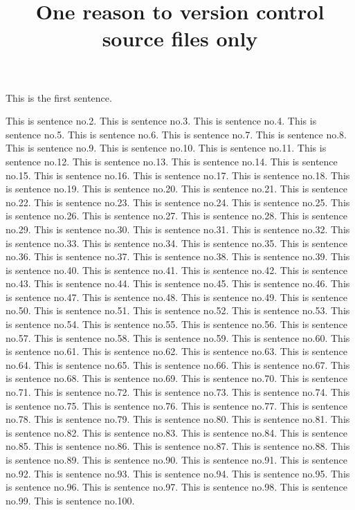 \documentclass{article}
\title{One reason to version control source files only}
\begin{document}
\maketitle

This is the first sentence.

This is sentence no.2.
This is sentence no.3.
This is sentence no.4.
This is sentence no.5.
This is sentence no.6.
This is sentence no.7.
This is sentence no.8.
This is sentence no.9.
This is sentence no.10.
This is sentence no.11.
This is sentence no.12.
This is sentence no.13.
This is sentence no.14.
This is sentence no.15.
This is sentence no.16.
This is sentence no.17.
This is sentence no.18.
This is sentence no.19.
This is sentence no.20.
This is sentence no.21.
This is sentence no.22.
This is sentence no.23.
This is sentence no.24.
This is sentence no.25.
This is sentence no.26.
This is sentence no.27.
This is sentence no.28.
This is sentence no.29.
This is sentence no.30.
This is sentence no.31.
This is sentence no.32.
This is sentence no.33.
This is sentence no.34.
This is sentence no.35.
This is sentence no.36.
This is sentence no.37.
This is sentence no.38.
This is sentence no.39.
This is sentence no.40.
This is sentence no.41.
This is sentence no.42.
This is sentence no.43.
This is sentence no.44.
This is sentence no.45.
This is sentence no.46.
This is sentence no.47.
This is sentence no.48.
This is sentence no.49.
This is sentence no.50.
This is sentence no.51.
This is sentence no.52.
This is sentence no.53.
This is sentence no.54.
This is sentence no.55.
This is sentence no.56.
This is sentence no.57.
This is sentence no.58.
This is sentence no.59.
This is sentence no.60.
This is sentence no.61.
This is sentence no.62.
This is sentence no.63.
This is sentence no.64.
This is sentence no.65.
This is sentence no.66.
This is sentence no.67.
This is sentence no.68.
This is sentence no.69.
This is sentence no.70.
This is sentence no.71.
This is sentence no.72.
This is sentence no.73.
This is sentence no.74.
This is sentence no.75.
This is sentence no.76.
This is sentence no.77.
This is sentence no.78.
This is sentence no.79.
This is sentence no.80.
This is sentence no.81.
This is sentence no.82.
This is sentence no.83.
This is sentence no.84.
This is sentence no.85.
This is sentence no.86.
This is sentence no.87.
This is sentence no.88.
This is sentence no.89.
This is sentence no.90.
This is sentence no.91.
This is sentence no.92.
This is sentence no.93.
This is sentence no.94.
This is sentence no.95.
This is sentence no.96.
This is sentence no.97.
This is sentence no.98.
This is sentence no.99.
This is sentence no.100.
\end{document}
